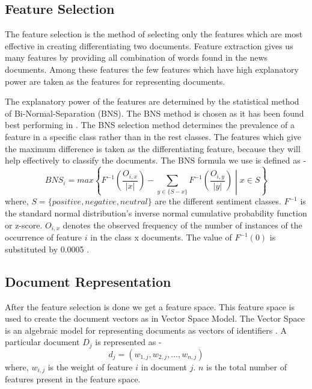 \documentclass[a4paper,12bp]{report}
\begin{document}
\subsection{Feature Selection}
The feature selection is the method of selecting only the features which are most effective in creating differentiating two documents. Feature extraction gives us many features by providing all combination of words found in the news documents. Among these features the few features which have high explanatory power are taken as the features for representing documents. 

The explanatory power of the features are determined by the statistical method of Bi-Normal-Separation (BNS). The BNS method is chosen as it has been found best performing in \cite{Hagenau:2013}. The BNS selection method determines the prevalence of a feature in a specific class rather than in the rest classes. The features which give the maximum difference is taken as the differentiating feature, because they will help effectively to classify the documents. The BNS formula we use is defined as - 
\begin{equation}
\label{eq:bns}
BNS_{i} = max \left\{ F^{-1} \left(\frac{O_{i,x}}{|x|}\right) - \sum_{y \in \{S - x\}} F^{-1} \left(\frac{O_{i,y}}{|y|}\right)  \middle| x \in S \right\}
\end{equation}
where, $S = \{ positive, negative, neutral \}$ are the different sentiment classes. $F^{-1}$ is the standard normal distribution's inverse normal cumulative probability function or z-score. $O_{i,x}$ denotes the observed frequency of the number of instances of the occurrence of feature $i$ in the class x documents. The value of $F^{-1}(0)$ is substituted by 0.0005 \cite{Forman:2003}.

\subsection{Document Representation}
After the feature selection is done we get a feature space. This feature space is used to create the document vectors as in Vector Space Model. The Vector Space is an algebraic model for representing documents as vectors of identifiers \cite{ wiki:20145}. A particular document $D_{j}$ is represented as - 
\begin{equation}
d_{j} = ( w_{1,j} , w_{2,j} , ... , w_{n,j} )
\end{equation}
where, $w_{i,j}$ is the weight of feature $i$ in document $j$. $n$ is the total number of features present in the feature space. 
\end{document}
